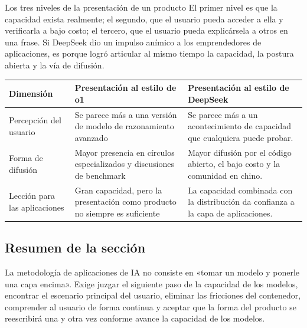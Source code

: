 \begin{importantbox}{Los tres niveles de la presentación de un producto}
El primer nivel es que la capacidad exista realmente; el segundo, que el usuario pueda acceder a ella y verificarla a bajo costo; el tercero, que el usuario pueda explicársela a otros en una frase. Si DeepSeek dio un impulso anímico a los emprendedores de aplicaciones, es porque logró articular al mismo tiempo la capacidad, la postura abierta y la vía de difusión.
\end{importantbox}

\noindent\begin{tabularx}{\textwidth}{p{}p{}X}
\toprule
Dimensión & Presentación al estilo de o1 & Presentación al estilo de DeepSeek \\
\midrule
Percepción del usuario & Se parece más a una versión de modelo de razonamiento avanzado & Se parece más a un acontecimiento de capacidad que cualquiera puede probar. \\
Forma de difusión & Mayor presencia en círculos especializados y discusiones de benchmark & Mayor difusión por el código abierto, el bajo costo y la comunidad en chino. \\
Lección para las aplicaciones & Gran capacidad, pero la presentación como producto no siempre es suficiente & La capacidad combinada con la distribución da confianza a la capa de aplicaciones. \\
\bottomrule
\end{tabularx}

\subsection{Resumen de la sección}

La metodología de aplicaciones de IA no consiste en «tomar un modelo y ponerle una capa encima». Exige juzgar el siguiente paso de la capacidad de los modelos, encontrar el escenario principal del usuario, eliminar las fricciones del contenedor, comprender al usuario de forma continua y aceptar que la forma del producto se reescribirá una y otra vez conforme avance la capacidad de los modelos.
